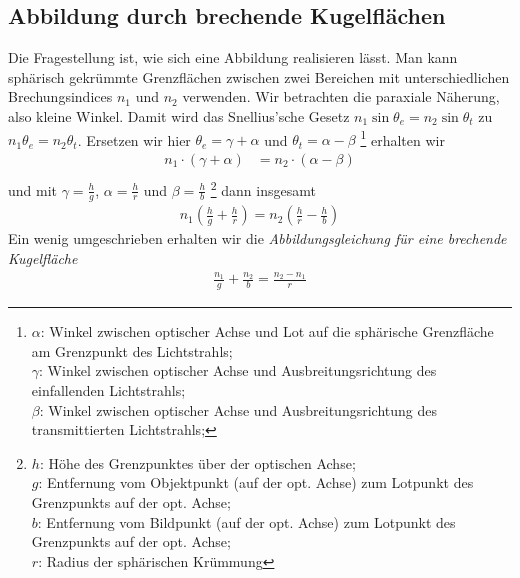 \subsection{Abbildung durch brechende Kugelflächen}
Die Fragestellung ist, wie sich eine Abbildung realisieren lässt.
Man kann sphärisch gekrümmte Grenzflächen zwischen zwei Bereichen mit
unterschiedlichen Brechungsindices $n_1$ und $n_2$ verwenden.
Wir betrachten die paraxiale Näherung, also kleine Winkel.
Damit wird das Snellius'sche Gesetz $n_1\sin\theta_e =
n_2\sin\theta_t$ zu $n_1\theta_e=n_2\theta_t$.
Ersetzen wir hier $\theta_e=\gamma+\alpha$ und $\theta_t=\alpha-\beta$%
\footnote{{} $\alpha$: Winkel zwischen optischer Achse und Lot auf die sphärische
  Grenzfläche am Grenzpunkt des Lichtstrahls;\\
  $\gamma$: Winkel zwischen optischer Achse und Ausbreitungsrichtung des
  einfallenden Lichtstrahls;\\
  $\beta$: Winkel zwischen optischer Achse und Ausbreitungsrichtung des
  transmittierten Lichtstrahls;}
erhalten wir
\begin{align*}
  n_1\cdot(\gamma+\alpha) &= n_2\cdot(\alpha-\beta)\\
\end{align*}
und mit
$\gamma = \frac{h}{g}$,
$\alpha =\frac{h}{r}$ und
$\beta = \frac{h}{b}$%
\footnote{{} $h$: Höhe des Grenzpunktes über der optischen Achse;\\
  $g$: Entfernung vom Objektpunkt (auf der opt. Achse) zum Lotpunkt des
  Grenzpunkts auf der opt. Achse;\\
  $b$: Entfernung vom Bildpunkt (auf der opt. Achse) zum Lotpunkt des
  Grenzpunkts auf der opt. Achse;\\
  $r$: Radius der sphärischen Krümmung}
dann insgesamt
\begin{gather*}
  n_1\left(\frac{h}{g} + \frac{h}{r}\right)
  = n_2\left(\frac{h}{r} - \frac{h}{b}\right)
\end{gather*}
Ein wenig umgeschrieben erhalten wir die \emph{Abbildungsgleichung für
  eine brechende Kugelfläche}
\begin{gather}
  \frac{n_1}{g} + \frac{n_2}{b} = \frac{n_2-n_1}{r}
  \label{abbgleichung}
\end{gather}


